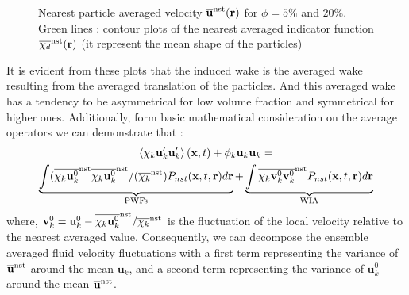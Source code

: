 \begin{figure}
    \caption{Nearest particle averaged velocity $\overline{\textbf{u}}^\text{nst}(\textbf{r})$ for  $\phi = 5\%$ and $20\%$.
    Green lines : contour plots of the nearest averaged indicator function $\overline{\chi_d}^\text{nst}(\textbf{r})$ (it represent the mean shape of the particles)}
    \label{fig:Stream}
\end{figure}
It is evident from these plots that the induced wake is the averaged wake resulting from the averaged translation of the particles. 
And this averaged wake has a tendency to be asymmetrical for low volume fraction and symmetrical for higher ones. 
Additionally, form basic mathematical consideration on the average operators we can demonstrate that :
\begin{multline*}
    \left<\chi_k \textbf{u}'_k\textbf{u}'_k\right>(\textbf{x},t)
    + \phi_k \textbf{u}_k\textbf{u}_k
    = \\
    \underbrace{\int (\overline{\chi_k \textbf{u}^0_k}^\text{nst}  \overline{\chi_k \textbf{u}^0_k}^\text{nst} / (\overline{\chi_k}^\text{nst})  P_{nst}(\textbf{x},t,\textbf{r}) d\textbf{r} }_\text{PWFs}
    +\underbrace{\int \overline{\chi_k \textbf{v}_k^0\textbf{v}_k^0}^\text{nst}  P_{nst}(\textbf{x},t,\textbf{r}) d\textbf{r}}_\text{WIA}
    \label{eq:def_uu}
\end{multline*}
where, $\textbf{v}_k^0  = \textbf{u}_k^0 - \overline{\chi_k \textbf{u}^0_k}^\text{nst} / \overline{\chi_k}^\text{nst}$ is the fluctuation of the local velocity relative to the nearest averaged value. 
Consequently, we can decompose the ensemble averaged fluid velocity fluctuations with a first term representing the variance of $\overline{\textbf{u}}^\text{nst}$ around the mean $\textbf{u}_k$, and a second term representing the variance of $\textbf{u}^0_k$ around the mean  $\overline{\textbf{u}}^\text{nst}$. 

